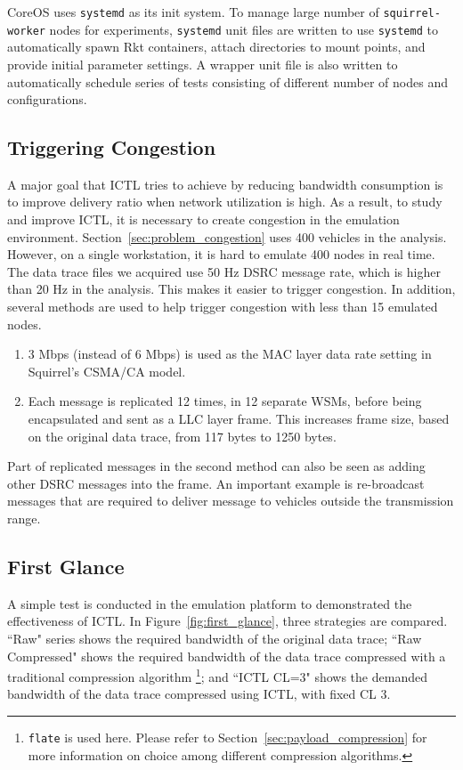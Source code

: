 \documentclass[12pt]{report}
\begin{document}
CoreOS uses \texttt{systemd} as its init system. To manage large number of \texttt{squirrel-worker} nodes for experiments, \texttt{systemd} unit files are written to use \texttt{systemd} to automatically spawn Rkt containers, attach directories to mount points, and provide initial parameter settings. A wrapper unit file is also written to automatically schedule series of tests consisting of different number of nodes and configurations.

\subsection{Triggering Congestion}
\label{sec:trigger_congestion}

A major goal that ICTL tries to achieve by reducing bandwidth consumption is to improve delivery ratio when network utilization is high. As a result, to study and improve ICTL, it is necessary to create congestion in the emulation environment. Section~\ref{sec:problem_congestion} uses 400 vehicles in the analysis. However, on a single workstation, it is hard to emulate 400 nodes in real time. The data trace files we acquired use 50 Hz DSRC message rate, which is higher than 20 Hz in the analysis. This makes it easier to trigger congestion. In addition, several methods are used to help trigger congestion with less than 15 emulated nodes.

\begin{enumerate}
  \item 3 Mbps (instead of 6 Mbps) is used as the MAC layer data rate setting in Squirrel's CSMA/CA model.
  \item Each message is replicated 12 times, in 12 separate WSMs, before being encapsulated and sent as a LLC layer frame. This increases frame size, based on the original data trace, from 117 bytes to 1250 bytes.
\end{enumerate}

Part of replicated messages in the second method can also be seen as adding other DSRC messages into the frame. An important example is re-broadcast messages that are required to deliver message to vehicles outside the transmission range.


\subsection{First Glance}

A simple test is conducted in the emulation platform to demonstrated the effectiveness of ICTL. In Figure~\ref{fig:first_glance}, three strategies are compared. ``Raw" series shows the required bandwidth of the original data trace; ``Raw Compressed" shows the required bandwidth of the data trace compressed with a traditional compression algorithm \footnote{\texttt{flate} is used here. Please refer to Section~\ref{sec:payload_compression} for more information on choice among different compression algorithms.}; and ``ICTL CL=3" shows the demanded bandwidth of the data trace compressed using ICTL, with fixed CL 3.
\end{document}
